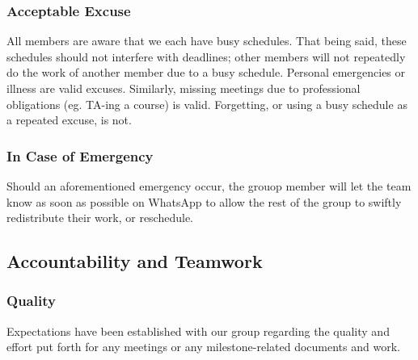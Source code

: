\documentclass{article}
\begin{document}
\subsubsection*{Acceptable Excuse}

\iffalse
\wss{What constitutes an acceptable excuse for missing a meeting or a deadline?
What types of excuses will not be considered acceptable?}
\fi

All members are aware that we each have busy schedules. That being said, these 
schedules should not interfere with deadlines; other members will not repeatedly 
do the work of another member due to a busy schedule. Personal emergencies or illness 
are valid excuses. Similarly, missing meetings due to professional obligations (eg. 
TA-ing a course) is valid. Forgetting, or using a busy schedule as a repeated excuse, is not.

\subsubsection*{In Case of Emergency}

\iffalse
\wss{What process will team members follow if they have an emergency and cannot
attend a team meeting or complete their individual work promised for a team
deliverable?}
\fi

Should an aforementioned emergency occur, the grouop member will let the team know as 
soon as possible on WhatsApp to allow the rest of the group to swiftly redistribute 
their work, or reschedule.

\subsection*{Accountability and Teamwork}

\subsubsection*{Quality}

\iffalse
\wss{What are your team's expectations regarding the quality
of team members' preparation for team meetings and the quality of the
deliverables that members bring to the team?}
\fi

Expectations have been established with our group regarding the quality and effort put forth for any meetings or any
milestone-related documents and work.\\
\end{document}

